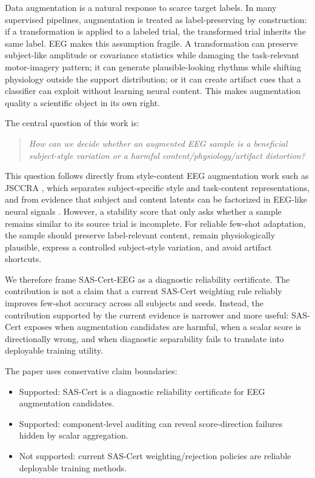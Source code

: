 \documentclass[11pt]{article}
\begin{document}
Data augmentation is a natural response to scarce target labels. In many supervised pipelines, augmentation is treated as label-preserving by construction: if a transformation is applied to a labeled trial, the transformed trial inherits the same label. EEG makes this assumption fragile. A transformation can preserve subject-like amplitude or covariance statistics while damaging the task-relevant motor-imagery pattern; it can generate plausible-looking rhythms while shifting physiology outside the support distribution; or it can create artifact cues that a classifier can exploit without learning neural content. This makes augmentation quality a scientific object in its own right.

The central question of this work is:

\begin{quote}
\emph{How can we decide whether an augmented EEG sample is a beneficial
subject-style variation or a harmful content/physiology/artifact distortion?}
\end{quote}

This question follows directly from style-content EEG augmentation work such as JSCCRA \cite{Ding2026JSCCRA}, which separates subject-specific style and task-content representations, and from evidence that subject and content latents can be factorized in EEG-like neural signals \cite{Bollens2022SubjectInvariantVAE}. However, a stability score that only asks whether a sample remains similar to its source trial is incomplete. For reliable few-shot adaptation, the sample should preserve label-relevant content, remain physiologically plausible, express a controlled subject-style variation, and avoid artifact shortcuts.

We therefore frame SAS-Cert-EEG as a diagnostic reliability certificate. The contribution is not a claim that a current SAS-Cert weighting rule reliably improves few-shot accuracy across all subjects and seeds. Instead, the contribution supported by the current evidence is narrower and more useful: SAS-Cert exposes when augmentation candidates are harmful, when a scalar score is directionally wrong, and when diagnostic separability fails to translate into deployable training utility.

The paper uses conservative claim boundaries:

\begin{itemize}
\item Supported: SAS-Cert is a diagnostic reliability certificate for EEG augmentation candidates.
\item Supported: component-level auditing can reveal score-direction failures hidden by scalar aggregation.
\item Not supported: current SAS-Cert weighting/rejection policies are reliable deployable training methods.
\end{itemize}
\end{document}
